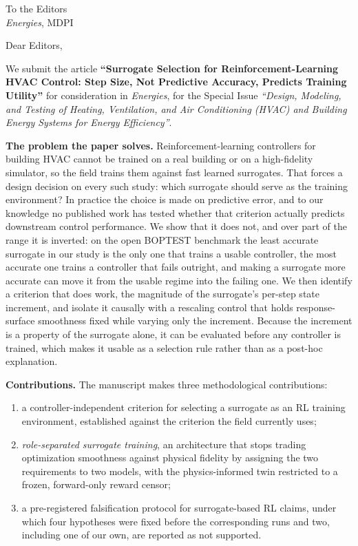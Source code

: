 \documentclass[11pt,a4paper]{article}
\begin{document}
To the Editors\\
\emph{Energies}, MDPI

Dear Editors,

We submit the article \textbf{``Surrogate Selection for Reinforcement-Learning HVAC Control:
Step Size, Not Predictive Accuracy, Predicts Training Utility''} for consideration in
\emph{Energies}, for the Special Issue \emph{``Design, Modeling, and Testing of Heating,
Ventilation, and Air Conditioning (HVAC) and Building Energy Systems for Energy Efficiency''}.

\textbf{The problem the paper solves.} Reinforcement-learning controllers for building HVAC cannot
be trained on a real building or on a high-fidelity simulator, so the field trains them against fast
learned surrogates. That forces a design decision on every such study: which surrogate should serve
as the training environment? In practice the choice is made on predictive error, and to our
knowledge no published work has tested whether that criterion actually predicts downstream control
performance. We show that it does not, and over part of the range it is inverted: on the open
BOPTEST benchmark the least accurate surrogate in our study is the only one that trains a usable
controller, the most accurate one trains a controller that fails outright, and making a surrogate
more accurate can move it from the usable regime into the failing one. We then identify a criterion that
does work, the magnitude of the surrogate's per-step state increment, and isolate it causally with a
rescaling control that holds response-surface smoothness fixed while varying only the increment.
Because the increment is a property of the surrogate alone, it can be evaluated before any
controller is trained, which makes it usable as a selection rule rather than as a post-hoc
explanation.

\textbf{Contributions.} The manuscript makes three methodological contributions:

\begin{enumerate}[leftmargin=*,itemsep=1pt,topsep=2pt]
\item a controller-independent criterion for selecting a surrogate as an RL training environment,
established against the criterion the field currently uses;
\item \emph{role-separated surrogate training}, an architecture that stops trading optimization
smoothness against physical fidelity by assigning the two requirements to two models, with the
physics-informed twin restricted to a frozen, forward-only reward censor;
\item a pre-registered falsification protocol for surrogate-based RL claims, under which four
hypotheses were fixed before the corresponding runs and two, including one of our own, are reported
as not supported.
\end{enumerate}
\end{document}

